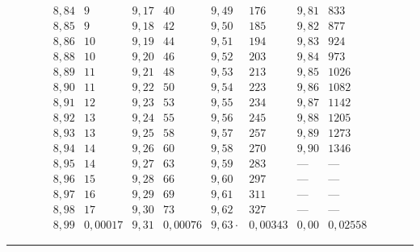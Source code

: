 \[\begin{array}{r|r||r|r||r|r||r|r}
8{,}84&9&9{,}17&40&9{,}49&176&9{,}81&833\\
8{,}85&9&9{,}18&42&9{,}50&185&9{,}82&877\\
8{,}86&10&9{,}19&44&9{,}51&194&9{,}83&924\\
8{,}88&10&9{,}20&46&9{,}52&203&9{,}84&973\\
8{,}89&11&9{,}21&48&9{,}53&213&9{,}85&1026\\
8{,}90&11&9{,}22&50&9{,}54&223&9{,}86&1082\\
8{,}91&12&9{,}23&53&9{,}55&234&9{,}87&1142\\
8{,}92&13&9{,}24&55&9{,}56&245&9{,}88&1205\\
8{,}93&13&9{,}25&58&9{,}57&257&9{,}89&1273\\
8{,}94&14&9{,}26&60&9{,}58&270&9{,}90&1346\\
8{,}95&14&9{,}27&63&9{,}59&283&\text{—}&\text{—}\\
8{,}96&15&9{,}28&66&9{,}60&297&\text{—}&\text{—}\\
8{,}97&16&9{,}29&69&9{,}61&311&\text{—}&\text{—}\\
8{,}98&17&9{,}30&73&9{,}62&327&\text{—}&\text{—}\\
8{,}99&0{,}00017&9{,}31&0{,}00076&9{,}63\mathpunct{\cdot}&0{,}00343&0{,}00&0{,}02558
\end{array}
\]
\begin{center}\rule{.3\linewidth}{.4pt}\end{center}
